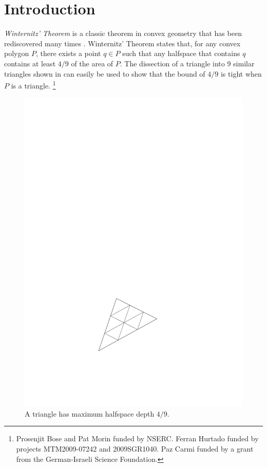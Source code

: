 \documentclass{birkjour}
\begin{document}
\section{Introduction}
\emph{Winternitz' Theorem} \cite[pp.~54--55]{b23} is a classic theorem
in convex geometry that has been rediscovered many times
\cite{e55b,ll35,n45,n58,yb51}.  Winternitz' Theorem states that, for
any convex polygon $P$, there exists a point $q\in P$ such that any
halfspace that contains $q$ contains at least $4/9$ of the area of
$P$.  The dissection of a triangle into 9 similar triangles shown in
 can easily be used to show that the bound of $4/9$
is tight when $P$ is a triangle.
\let\thefootnote\relax\footnote{Prosenjit Bose and Pat Morin funded by NSERC. Ferran Hurtado funded by projects MTM2009-07242 and 2009SGR1040. Paz Carmi funded by a grant from the German-Israeli Science Foundation.  }

\begin{figure}[htbp]
  \begin{center}
    \includegraphics{2089-figure1}
  \end{center}
  \caption{A triangle has maximum halfspace depth $4/9$.}
\end{figure}
\end{document}
